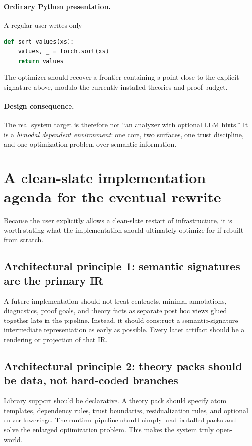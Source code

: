 \documentclass[11pt]{article}
\theoremstyle{definition}
\theoremstyle{plain}
\begin{document}
\paragraph{Ordinary Python presentation.}
A regular user writes only
\begin{lstlisting}[style=deppy,language=Python]
def sort_values(xs):
    values, _ = torch.sort(xs)
    return values
\end{lstlisting}
The optimizer should recover a frontier containing a point close to the explicit
signature above, modulo the currently installed theories and proof budget.

\paragraph{Design consequence.}
The real system target is therefore not ``an analyzer with optional LLM hints.''
It is a \emph{bimodal dependent environment}: one core, two surfaces, one trust
discipline, and one optimization problem over semantic information.

\section{A clean-slate implementation agenda for the eventual rewrite}

Because the user explicitly allows a clean-slate restart of infrastructure, it is
worth stating what the implementation should ultimately optimize for if rebuilt
from scratch.

\subsection{Architectural principle 1: semantic signatures are the primary IR}
A future implementation should not treat contracts, minimal annotations,
diagnostics, proof goals, and theory facts as separate post hoc views glued
together late in the pipeline. Instead, it should construct a semantic-signature
intermediate representation as early as possible. Every later artifact should be
a rendering or projection of that IR.

\subsection{Architectural principle 2: theory packs should be data, not hard-coded branches}
Library support should be declarative. A theory pack should specify atom
templates, dependency rules, trust boundaries, residualization rules, and
optional solver lowerings. The runtime pipeline should simply load installed
packs and solve the enlarged optimization problem. This makes the system truly
open-world.
\end{document}
